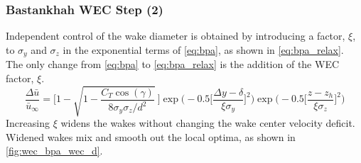 \documentclass[hidelinks,sort&compress,AMA,STIX1COL]{WileyNJD-v2}
\begin{document}
\subsubsection{Bastankhah WEC Step (2)}
Independent control of the wake diameter is obtained by introducing a factor, $\xi$, to $\sigma_y$ and $\sigma_z$ in the exponential terms of \cref{eq:bpa}, as shown in \cref{eq:bpa_relax}. The only change from \cref{eq:bpa} to \cref{eq:bpa_relax} is the addition of the WEC factor, $\xi$.
\begin{equation}
	\frac{\Delta \bar{u}}{\bar{u}_{\infty}} = \Bigg[1-\sqrt{1-\frac{C_T \cos{(\gamma)}}{8 \sigma_y \sigma_z/d^2}}~\Bigg] \exp{\bigg(-0.5\Big[\frac{\Delta y-\delta}{\xi \sigma_y}\Big]^2\bigg)}\exp{\bigg(-0.5\Big[\frac{z-z_h}{\xi \sigma_z}\Big]^2\bigg)}
	\label{eq:bpa_relax}
\end{equation}
Increasing $\xi$ widens the wakes without changing the wake center velocity deficit. Widened wakes mix and smooth out the local optima, as shown in \cref{fig:wec_bpa_wec_d}. 
%
\end{document}
